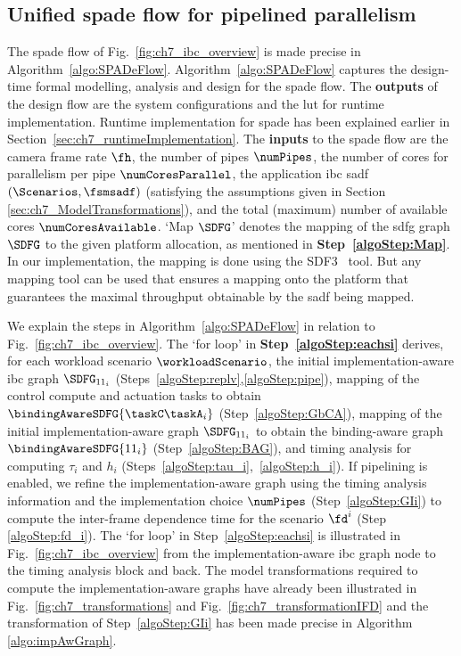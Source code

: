 \subsection{Unified \texorpdfstring{\Gls{spade}}{SPADe} flow for pipelined parallelism}
\label{sec:ch7_unified SPADe flow}
 The \gls{spade} flow of Fig.~\ref{fig:ch7_ibc_overview} is made precise in Algorithm~\ref{algo:SPADeFlow}. 
 Algorithm~\ref{algo:SPADeFlow} captures the design-time formal modelling, analysis and design for the \gls{spade} flow.
 The \textbf{outputs} of the design flow are the system configurations and the \gls{lut} for runtime implementation.
 Runtime implementation for \gls{spade} has been explained earlier in Section~\ref{sec:ch7_runtimeImplementation}.
 The \textbf{inputs} to the \gls{spade} flow are the camera frame rate $\fh$, the number of pipes $\numPipes$, the number of cores for parallelism per pipe $\numCoresParallel$, the application \gls{ibc} \gls{sadf} $(\Scenarios,\fsmsadf)$ (satisfying the assumptions given in Section \ref{sec:ch7_ModelTransformations}), and the total (maximum) number of available cores $\numCoresAvailable$. 
 `Map $\SDFG$' denotes the mapping of the \gls{sdfg} graph $\SDFG$ to the given platform allocation, as mentioned in \textbf{Step~\ref{algoStep:Map}}.
 In our implementation, the mapping is done using the SDF3~\cite{stuijk2006sdf} tool. But any mapping tool can be used that ensures a mapping onto the platform that guarantees the maximal throughput obtainable by the \gls{sadf} being mapped.
 
We explain the steps in Algorithm~\ref{algo:SPADeFlow} in relation to Fig.~\ref{fig:ch7_ibc_overview}.
The `for loop' in \textbf{Step~\ref{algoStep:eachsi}} derives, for each workload scenario $\workloadScenario$, the initial implementation-aware \gls{ibc} graph $\SDFG_{11_i}$ (Steps~\ref{algoStep:replv},\ref{algoStep:pipe}), mapping of the control compute and actuation tasks to obtain $\bindingAwareSDFG{\taskC\taskA_i}$ (Step~\ref{algoStep:GbCA}), mapping of the initial implementation-aware graph $\SDFG_{11_i}$ to obtain the binding-aware graph $\bindingAwareSDFG{11_i}$ (Step~\ref{algoStep:BAG}), and timing analysis for computing $\tau_i$ and $h_i$ (Steps~\ref{algoStep:tau_i},~\ref{algoStep:h_i}). If pipelining is enabled, we refine the implementation-aware graph using the timing analysis information and the implementation choice $\numPipes$ (Step~\ref{algoStep:GIi}) to compute the inter-frame dependence time for the scenario $\fd^i$ (Step \ref{algoStep:fd_i}).
The `for loop' in Step~\ref{algoStep:eachsi} is illustrated in Fig.~\ref{fig:ch7_ibc_overview} from the implementation-aware \gls{ibc} graph node to the timing analysis block and back.
The model transformations required to compute the implementation-aware graphs have already been illustrated in Fig.~\ref{fig:ch7_transformations} and Fig.~\ref{fig:ch7_transformationIFD} and the transformation of Step~\ref{algoStep:GIi} has been made precise in Algorithm \ref{algo:impAwGraph}.

